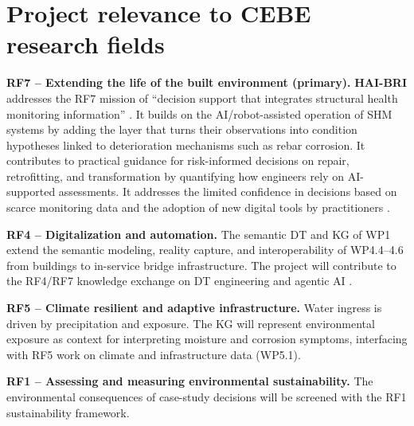 \documentclass[12pt,a4paper]{article}
\newcommand{\projectname}{\textbf{HAI-BRI }} %
\newif\iftemplatenotes
\newcommand{\lengthnote}[1]{%
  \iftemplatenotes
    {\small\itshape\color{gray!70!black} [Target length: #1]}\par\vspace{4pt}
  \fi
}
\begin{document}
\section{Project relevance to CEBE research fields}
\justifying
\setlength{\parindent}{0pt}
\setlength{\parskip}{0.8em}
%
\textbf{RF7 -- Extending the life of the built environment (primary).} \projectname addresses the RF7 mission of ``decision support that integrates structural health monitoring information'' \cite[p.~132]{cebe_research_roadmap_2026}. It builds on the AI/robot-assisted operation of SHM systems \cite[p.~148]{cebe_research_roadmap_2026} by adding the layer that turns their observations into condition hypotheses linked to deterioration mechanisms such as rebar corrosion. It contributes to practical guidance for risk-informed decisions on repair, retrofitting, and transformation \cite[p.~145]{cebe_research_roadmap_2026} by quantifying how engineers rely on AI-supported assessments. It addresses the limited confidence in decisions based on scarce monitoring data and the adoption of new digital tools by practitioners \cite[p.~141]{cebe_research_roadmap_2026}.\par 
%
\vspace{-0.2cm}
\textbf{RF4 -- Digitalization and automation.} The semantic DT and KG of WP1 extend the semantic modeling, reality capture, and interoperability of WP4.4--4.6 \cite[pp.~79--80]{cebe_research_roadmap_2026} from buildings to in-service bridge infrastructure. The project will contribute to the RF4/RF7 knowledge exchange on DT engineering and agentic AI \cite[p.~146]{cebe_research_roadmap_2026}.\par 
%
\vspace{-0.2cm}
\textbf{RF5 -- Climate resilient and adaptive infrastructure.} Water ingress is driven by precipitation and exposure. The KG will represent environmental exposure as context for interpreting moisture and corrosion symptoms, interfacing with RF5 work on climate and infrastructure data (WP5.1)\cite[p.~102]{cebe_research_roadmap_2026}.
\par 
%
\vspace{-0.2cm}
\textbf{RF1 -- Assessing and measuring environmental sustainability.} The environmental consequences of case-study decisions will be screened with the RF1 sustainability framework\cite[p.~24]{cebe_research_roadmap_main_2026}.
\end{document}
